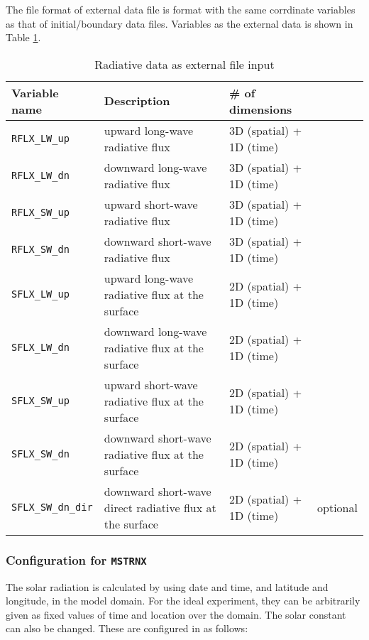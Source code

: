 \noindent
The file format of external data file is \netcdf format 
with the same corrdinate variables as that of initial/boundary data files.
Variables as the external data is shown in Table \ref{tab:var_list_atm_rd_offline}.
\begin{table}[h]
\begin{center}
  \caption{Radiative data as external file input}
  \label{tab:var_list_atm_rd_offline}
  \begin{tabularx}{150mm}{lXll} \hline
    \rowcolor[gray]{0.9}  Variable name & Description & \# of dimensions & \\ \hline
      \verb|RFLX_LW_up|     & upward long-wave radiative flux & 3D (spatial) + 1D (time) \\
      \verb|RFLX_LW_dn|     & downward long-wave radiative flux & 3D (spatial) + 1D (time) \\
      \verb|RFLX_SW_up|     & upward short-wave radiative flux & 3D (spatial) + 1D (time) \\
      \verb|RFLX_SW_dn|     & downward short-wave radiative flux & 3D (spatial) + 1D (time) \\
      \verb|SFLX_LW_up|     & upward long-wave radiative flux at the surface & 2D (spatial) + 1D (time) \\
      \verb|SFLX_LW_dn|     & downward long-wave radiative flux at the surface & 2D (spatial) + 1D (time) \\
      \verb|SFLX_SW_up|     & upward short-wave radiative flux at the surface & 2D (spatial) + 1D (time) \\
      \verb|SFLX_SW_dn|     & downward short-wave radiative flux at the surface & 2D (spatial) + 1D (time) \\
      \verb|SFLX_SW_dn_dir| & downward short-wave direct radiative flux at the surface & 2D (spatial) + 1D (time) & optional \\
    \hline
  \end{tabularx}
\end{center}
\end{table}



\subsubsection{Configuration for \texttt{MSTRNX}}


The solar radiation is calculated by using date and time, and latitude and longitude, in the model domain. For the ideal experiment, they can be arbitrarily given as fixed values of time and location over the domain. The solar constant can also be changed. These are configured in  as follows:

